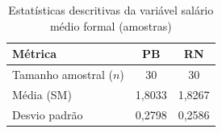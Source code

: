 \begin{table}[htbp] 
\centering
\caption{Estatísticas descritivas da variável salário médio formal (amostras)}
\label{tab:descritiva_salario}
\begin{tabular}{lcc}
\toprule
\textbf{Métrica} & \textbf{PB} & \textbf{RN} \\
\midrule
Tamanho amostral ($n$) & 30 & 30 \\
Média (SM) & 1,8033 & 1,8267 \\
Desvio padrão & 0,2798 & 0,2586 \\
\bottomrule
\end{tabular}
\end{table}
